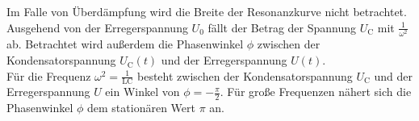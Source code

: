 Im Falle von Überdämpfung wird die Breite der Resonanzkurve nicht betrachtet. Ausgehend von der  Erregerspannung $U_0$ fällt der Betrag der Spannung $U_\mathup{C}$  mit $\frac{1}{\omega^2}$ ab.
Betrachtet wird außerdem die Phasenwinkel $\phi$ zwischen der Kondensatorspannung $U_\mathup{C}(t)$ und der Erregerspannung $U(t)$.\\
Für die Frequenz $\omega^2 = \frac{1}{\mathup{LC}}$ besteht zwischen der Kondensatorspannung $U_\mathup{C}$ und der Erregerspannung $U$ ein Winkel von $\phi =-\frac{\pi}{2}$.
Für große Frequenzen nähert sich die Phasenwinkel $\phi$ dem stationären Wert $\pi$ an.










